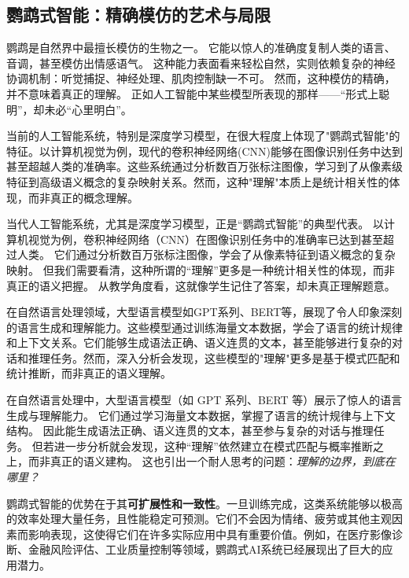 \subsection{鹦鹉式智能：精确模仿的艺术与局限}

鹦鹉是自然界中最擅长模仿的生物之一。
它能以惊人的准确度复制人类的语言、音调，甚至模仿出情感语气。
这种能力表面看来轻松自然，实则依赖复杂的神经协调机制：听觉捕捉、神经处理、肌肉控制缺一不可。
然而，这种模仿的精确，并不意味着真正的理解。
正如人工智能中某些模型所表现的那样——“形式上聪明”，却未必“心里明白”。

当前的人工智能系统，特别是深度学习模型，在很大程度上体现了"鹦鹉式智能"的特征。以计算机视觉为例，现代的卷积神经网络(CNN)能够在图像识别任务中达到甚至超越人类的准确率。这些系统通过分析数百万张标注图像，学习到了从像素级特征到高级语义概念的复杂映射关系。然而，这种"理解"本质上是统计相关性的体现，而非真正的概念理解。

当代人工智能系统，尤其是深度学习模型，正是“鹦鹉式智能”的典型代表。
以计算机视觉为例，卷积神经网络（CNN）在图像识别任务中的准确率已达到甚至超过人类。
它们通过分析数百万张标注图像，学会了从像素特征到语义概念的复杂映射。
但我们需要看清，这种所谓的“理解”更多是一种统计相关性的体现，而非真正的语义把握。
从教学角度看，这就像学生记住了答案，却未真正理解题意。

在自然语言处理领域，大型语言模型如GPT系列、BERT等，展现了令人印象深刻的语言生成和理解能力。这些模型通过训练海量文本数据，学会了语言的统计规律和上下文关系。它们能够生成语法正确、语义连贯的文本，甚至能够进行复杂的对话和推理任务。然而，深入分析会发现，这些模型的"理解"更多是基于模式匹配和统计推断，而非真正的语义理解。

在自然语言处理中，大型语言模型（如 GPT 系列、BERT 等）展示了惊人的语言生成与理解能力。
它们通过学习海量文本数据，掌握了语言的统计规律与上下文结构。
因此能生成语法正确、语义连贯的文本，甚至参与复杂的对话与推理任务。
但若进一步分析就会发现，这种“理解”依然建立在模式匹配与概率推断之上，而非真正的语义建构。
这也引出一个耐人思考的问题：\emph{理解的边界，到底在哪里？}

鹦鹉式智能的优势在于其\textbf{可扩展性和一致性}。一旦训练完成，这类系统能够以极高的效率处理大量任务，且性能稳定可预测。它们不会因为情绪、疲劳或其他主观因素而影响表现，这使得它们在许多实际应用中具有重要价值。例如，在医疗影像诊断、金融风险评估、工业质量控制等领域，鹦鹉式AI系统已经展现出了巨大的应用潜力。

